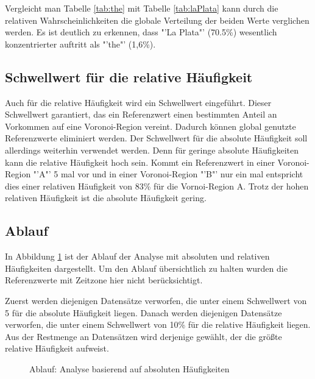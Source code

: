 				Vergleicht man Tabelle \ref{tab:the} mit Tabelle \ref{tab:laPlata} kann durch die relativen Wahrscheinlichkeiten die globale Verteilung der beiden Werte verglichen werden.
				Es ist deutlich zu erkennen, dass "'La Plata"' (70.5\%) wesentlich konzentrierter auftritt als "'the"' (1,6\%).

			\subsection{Schwellwert für die relative Häufigkeit}

				Auch für die relative Häufigkeit wird ein Schwellwert eingeführt. 
				Dieser Schwellwert garantiert, das ein Referenzwert einen bestimmten Anteil an Vorkommen auf eine Voronoi-Region vereint.
				Dadurch können global genutzte Referenzwerte eliminiert werden.
				Der Schwellwert für die absolute Häufigkeit soll allerdings weiterhin verwendet werden. 
				Denn für geringe absolute Häufigkeiten kann die relative Häufigkeit hoch sein.
				Kommt ein Referenzwert in einer Voronoi-Region "'A"' 5 mal vor und in einer Voronoi-Region "'B"' nur ein mal entspricht dies einer relativen Häufigkeit von 83\% für die Vornoi-Region A.
				Trotz der hohen relativen Häufigkeit ist die absolute Häufigkeit gering.    
			
			\subsection{Ablauf}

				In Abbildung \ref{img:relHaufBsp} ist der Ablauf der Analyse mit absoluten und relativen Häufigkeiten dargestellt.
				Um den Ablauf übersichtlich zu halten wurden die Referenzwerte mit Zeitzone hier nicht berücksichtigt.
				
				Zuerst werden diejenigen Datensätze verworfen, die unter einem Schwellwert von 5 für die absolute Häufigkeit liegen.
				Danach werden diejenigen Datensätze verworfen, die unter einem Schwellwert von 10\% für die relative Häufigkeit liegen.
				Aus der Restmenge an Datensätzen wird derjenige gewählt, der die größte relative Häufigkeit aufweist. 

				 \begin{figure}[!ht]
	
						\centering
						\caption{Ablauf: Analyse basierend auf absoluten Häufigkeiten}
						\label{img:relHaufBsp}
					
				\end{figure}

